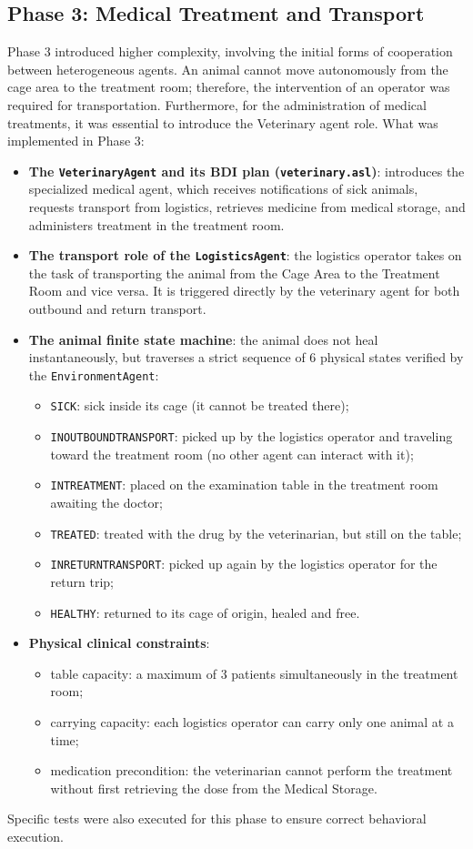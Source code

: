 \documentclass{article}
\renewcommand{\_}{\oldtextunderscore\allowbreak}
\begin{document}
\subsection{Phase 3: Medical Treatment and Transport}
Phase 3 introduced higher complexity, involving the initial forms of cooperation between heterogeneous agents. An animal cannot move autonomously from the cage area to the treatment room; therefore, the intervention of an operator was required for transportation. Furthermore, for the administration of medical treatments, it was essential to introduce the Veterinary agent role.
What was implemented in Phase 3:
\begin{itemize}
    \item \textbf{The \texttt{VeterinaryAgent} and its BDI plan (\texttt{veterinary.asl})}: introduces the specialized medical agent, which receives notifications of sick animals, requests transport from logistics, retrieves medicine from medical storage, and administers treatment in the treatment room.
    \item \textbf{The transport role of the \texttt{LogisticsAgent}}: the logistics operator takes on the task of transporting the animal from the Cage Area to the Treatment Room and vice versa. It is triggered directly by the veterinary agent for both outbound and return transport.
    \item \textbf{The animal finite state machine}: the animal does not heal instantaneously, but traverses a strict sequence of 6 physical states verified by the \texttt{EnvironmentAgent}:
    \begin{itemize}
        \item \texttt{SICK}: sick inside its cage (it cannot be treated there);
        \item \texttt{IN\_OUTBOUND\_TRANSPORT}: picked up by the logistics operator and traveling toward the treatment room (no other agent can interact with it);
        \item \texttt{IN\_TREATMENT}: placed on the examination table in the treatment room awaiting the doctor;
        \item \texttt{TREATED}: treated with the drug by the veterinarian, but still on the table;
        \item \texttt{IN\_RETURN\_TRANSPORT}: picked up again by the logistics operator for the return trip;
        \item \texttt{HEALTHY}: returned to its cage of origin, healed and free.
    \end{itemize}
    \item \textbf{Physical clinical constraints}:
    \begin{itemize}
        \item table capacity: a maximum of 3 patients simultaneously in the treatment room;
        \item carrying capacity: each logistics operator can carry only one animal at a time;
        \item medication precondition: the veterinarian cannot perform the treatment without first retrieving the dose from the Medical Storage.
    \end{itemize}
\end{itemize}
Specific tests were also executed for this phase to ensure correct behavioral execution.
\end{document}
